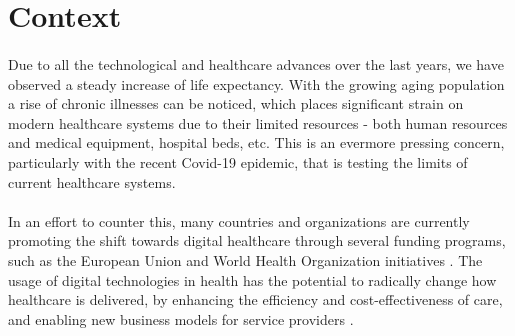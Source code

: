 

\section{Context}


\paragraph{} Due to all the technological and healthcare advances over the last years, we have observed a steady increase of life expectancy. With the growing aging population a rise of chronic illnesses can be noticed, which places significant strain on modern healthcare systems due to their limited resources - both human resources and medical equipment, hospital beds, etc. This is an evermore pressing concern, particularly with the recent Covid-19 epidemic, that is testing the limits of current healthcare systems. 

\paragraph{} In an effort to counter this, many countries and organizations are currently promoting the shift towards digital healthcare through several funding programs, such as the European Union \cite{EuropeanUnion2021} and World Health Organization initiatives \cite{WorldHealthOrganization2020}. The usage of digital technologies in health has the potential to radically change how healthcare is delivered, by enhancing the efficiency and cost-effectiveness of care, and enabling new business models for service providers \cite{WorldHealthOrganization2020}.

